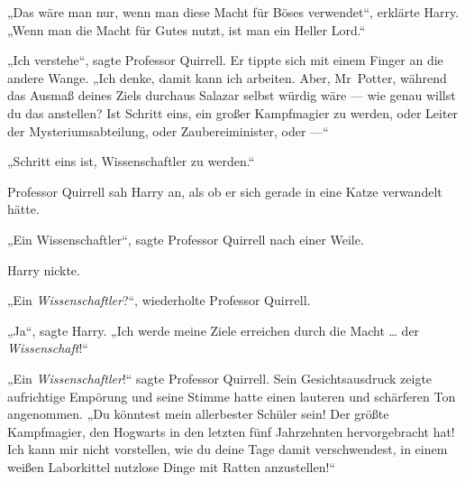 „Das wäre man nur, wenn man diese Macht für Böses verwendet“, erklärte Harry.
„Wenn man die Macht für Gutes nutzt, ist man ein Heller Lord.“

„Ich verstehe“, sagte Professor Quirrell. Er tippte sich mit einem Finger an die andere Wange.
„Ich denke, damit kann ich arbeiten. Aber, Mr~Potter, während das Ausmaß deines Ziels durchaus Salazar selbst würdig wäre — wie genau willst du das anstellen? Ist Schritt eins, ein großer Kampfmagier zu werden, oder Leiter der Mysteriumsabteilung, oder Zaubereiminister, oder —“

„Schritt eins ist, Wissenschaftler zu werden.“

Professor Quirrell sah Harry an, als ob er sich gerade in eine Katze verwandelt hätte.

„Ein Wissenschaftler“, sagte Professor Quirrell nach einer Weile.

Harry nickte.

„Ein \emph{Wissenschaftler}?“, wiederholte Professor Quirrell.

„Ja“, sagte Harry.
„Ich werde meine Ziele erreichen durch die Macht … der \emph{Wissenschaft}!“

„Ein \emph{Wissenschaftler}!“ sagte Professor Quirrell. Sein Gesichtsausdruck zeigte aufrichtige Empörung und seine Stimme hatte einen lauteren und schärferen Ton angenommen.
„Du könntest mein allerbester Schüler sein! Der größte Kampfmagier, den Hogwarts in den letzten fünf Jahrzehnten hervorgebracht hat! Ich kann mir nicht vorstellen, wie du deine Tage damit verschwendest, in einem weißen Laborkittel nutzlose Dinge mit Ratten anzustellen!“

